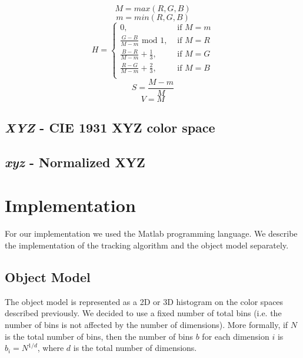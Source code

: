 \documentclass[11pt]{article}
\begin{document}
\begin{equation}
  M = max(R,G,B)
  \label{eq:M}
\end{equation}
\begin{equation}
  m = min(R,G,B)
  \label{eq:m}
\end{equation}
\begin{equation}
  H =
    \left\{\begin{array}{ll}
      0, & \textrm{~if~} M = m \\
      \frac{G-B}{M-m} \textrm{~mod~} 1,& \textrm{~if~} M = R \\
      \frac{B-R}{M-m} + \frac{1}{3},& \textrm{~if~} M = G \\
      \frac{R-G}{M-m} + \frac{2}{3},& \textrm{~if~} M = B \\      
    \end{array}\right.
  \label{eq:H}
\end{equation}
\begin{equation}
  S = \frac{M-m}{M}
  \label{eq:S}
\end{equation}
\begin{equation}
  V = M
  \label{eq:V}
\end{equation}

\subsection{\textit{XYZ} - CIE 1931 XYZ color space}

\subsection{\textit{xyz} - Normalized XYZ}

\section{Implementation} \label{sec:implementation}
For our implementation we used the Matlab programming language. We describe the
implementation of the tracking algorithm and the object model separately.

\subsection{Object Model} \label{sec:model}
The object model is represented as a 2D or 3D histogram on the color spaces
described previously. We decided to use a fixed number of total bins (i.e. the
number of bins is not affected by the number of dimensions).  More formally, if
$N$ is the total number of bins, then the number of bins $b$ for each dimension
$i$ is $b_i = N^{1/d}$, where $d$ is the total number of dimensions. 
\end{document}
